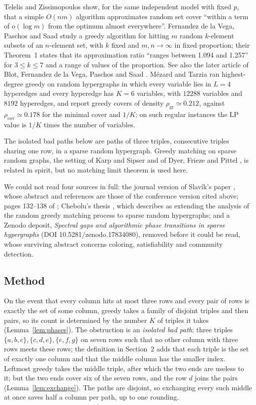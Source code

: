 \documentclass[11pt]{article}
\theoremstyle{remark}
\begin{document}
Telelis and Zissimopoulos \cite[Theorem~4, p.~174]{TZ} show, for the same
independent model with fixed $p$, that a simple $O(nm)$ algorithm
approximates random set cover ``within a term of $o(\log m)$ from the
optimum almost everywhere''. Fernandez de la Vega, Paschos and Saad
\cite{FPS} study a greedy algorithm for hitting $m$ random $k$-element
subsets of an $n$-element set, with $k$ fixed and $m,n\to\infty$ in fixed
proportion; their Theorem~1 \cite[p.~131]{FPS} states that its
approximation ratio ``ranges between 1.094 and 1.257'' for $3\le k\le7$
and a range of values of the proportion. See also the later
article of Blot, Fernandez de la Vega, Paschos and Saad \cite{BFPS}.
M\'ezard and Tarzia \cite[Sections~V.C--V.D and Fig.~5]{MT} ran highest-degree
greedy on random hypergraphs in which every variable lies in $L=4$
hyperedges and every hyperedge has $K=6$ variables, with $12288$ variables
and $8192$ hyperedges, and report greedy covers of density
$\rho_{\mathrm{gr}}\simeq0.212$, against $\rho_{\mathrm{cov}}\simeq0.178$
for the minimal cover and $1/K$; on such regular instances the LP value
is $1/K$ times the number of variables.

The isolated bad paths below are paths of three triples, consecutive
triples sharing one row, in a sparse random hypergraph. Greedy matching on sparse random graphs, the setting of
Karp and Sipser \cite{KS} and of Dyer, Frieze and Pittel \cite{DFP}, is
related in spirit, but no matching limit theorem is used here.

We could not read four sources in full: the journal version of
Slav\'ik's paper \cite{Slavik}, whose abstract and references are those of
the conference version cited above; pages 132--138 of \cite{FPS}; Chebolu's
thesis \cite{Chebolu}, which \cite[Section~1]{BB} describes as extending the
analysis of the random greedy matching process \cite{DFP} to sparse random
hypergraphs; and a Zenodo deposit, \emph{Spectral gaps and algorithmic phase
transitions in sparse hypergraphs} (DOI 10.5281/zenodo.17834080), removed
before it could be read, whose surviving abstract concerns coloring,
satisfiability and community detection.

\subsection{Method}
On the event that every column hits at most three rows and every pair of
rows is exactly the set of some column, greedy takes a family of disjoint
triples and then pairs, so its count is determined by the number $K$ of
triples it takes (Lemma~\ref{lem:phases}). The obstruction is an
\emph{isolated bad path}: three triples $\{a,b,c\},\{c,d,e\},\{e,f,g\}$ on
seven rows such that no other column with three rows meets these rows;
the definition in Section~2 adds that each triple is the set of exactly one
column and that the middle column has the smaller index. Leftmost greedy
takes the middle triple, after which the two ends are useless to it; but
the two ends cover six of the seven rows, and the row $d$ joins the pairs
(Lemma~\ref{lem:exchange}). The paths are disjoint, so exchanging every
such middle at once saves half a column per path, up to one rounding.
\end{document}
